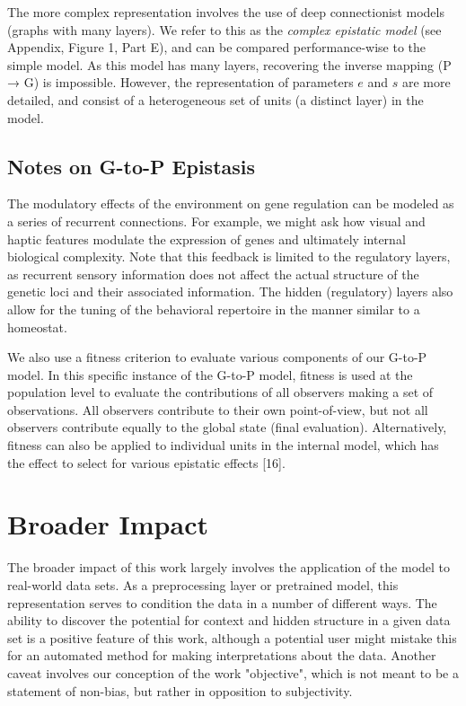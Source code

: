 \documentclass{article}
\begin{document}
The more complex representation involves the use of deep connectionist models (graphs with many layers). We refer to this as the {\it complex epistatic model} (see Appendix, Figure 1, Part E), and can be compared performance-wise to the simple model. As this model has many layers, recovering the inverse mapping (P → G) is impossible. However, the representation of parameters $e$ and $s$ are more detailed, and consist of a heterogeneous set of units (a distinct layer) in the model.

\subsection*{Notes on G-to-P Epistasis}
The modulatory effects of the environment on gene regulation can be modeled as a series of recurrent connections. For example, we might ask how visual and haptic features modulate the expression of genes and ultimately internal biological complexity. Note that this feedback is limited to the regulatory layers, as recurrent sensory information does not affect the actual structure of the genetic loci and their associated information. The hidden (regulatory) layers also allow for the tuning of the behavioral repertoire in the manner similar to a homeostat. 

We also use a fitness criterion to evaluate various components of our G-to-P model. In this specific instance of the G-to-P model, fitness is used at the population level to evaluate the contributions of all observers making a set of observations. All observers contribute to their own point-of-view, but not all observers contribute equally to the global state (final evaluation). Alternatively, fitness can also be applied to individual units in the internal model, which has the effect to select for various epistatic effects [16].

\section*{Broader Impact}
The broader impact of this work largely involves the application of the model to real-world data sets. As a preprocessing layer or pretrained model, this representation serves to condition the data in a number of different ways. The ability to discover the potential for context and hidden structure in a given data set is a positive feature of this work, although a potential user might mistake this for an automated method for making interpretations about the data. Another caveat involves our conception of the work "objective", which is not meant to be a statement of non-bias, but rather in opposition to subjectivity.  
\end{document}
